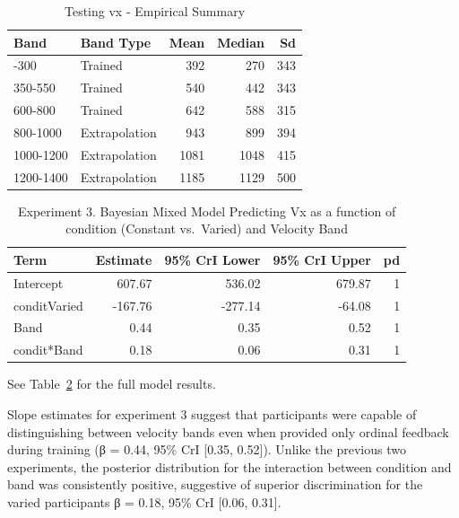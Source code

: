 \documentclass[
  letterpaper,
  DIV=11,
  numbers=noendperiod,
  oneside]{scrartcl}
\begin{document}
\begin{longtable}[]{@{}llrrr@{}}

\caption{\label{tbl-e3-test-nf-vx}Testing vx - Empirical Summary}

\tabularnewline

\toprule\noalign{}
Band & Band Type & Mean & Median & Sd \\
\midrule\noalign{}
\endhead
\bottomrule\noalign{}
\endlastfoot
100-300 & Trained & 392 & 270 & 343 \\
350-550 & Trained & 540 & 442 & 343 \\
600-800 & Trained & 642 & 588 & 315 \\
800-1000 & Extrapolation & 943 & 899 & 394 \\
1000-1200 & Extrapolation & 1081 & 1048 & 415 \\
1200-1400 & Extrapolation & 1185 & 1129 & 500 \\

\end{longtable}

\begin{longtable}[]{@{}lrrrr@{}}

\caption{\label{tbl-e3-bmm-vx}Experiment 3. Bayesian Mixed Model
Predicting Vx as a function of condition (Constant vs.~Varied) and
Velocity Band}

\tabularnewline

\toprule\noalign{}
Term & Estimate & 95\% CrI Lower & 95\% CrI Upper & pd \\
\midrule\noalign{}
\endhead
\bottomrule\noalign{}
\endlastfoot
Intercept & 607.67 & 536.02 & 679.87 & 1 \\
conditVaried & -167.76 & -277.14 & -64.08 & 1 \\
Band & 0.44 & 0.35 & 0.52 & 1 \\
condit*Band & 0.18 & 0.06 & 0.31 & 1 \\

\end{longtable}

See Table~\ref{tbl-e3-bmm-vx} for the full model results.

Slope estimates for experiment 3 suggest that participants were capable
of distinguishing between velocity bands even when provided only ordinal
feedback during training (β = 0.44, 95\% CrI {[}0.35, 0.52{]}). Unlike
the previous two experiments, the posterior distribution for the
interaction between condition and band was consistently positive,
suggestive of superior discrimination for the varied participants β =
0.18, 95\% CrI {[}0.06, 0.31{]}.
\end{document}
